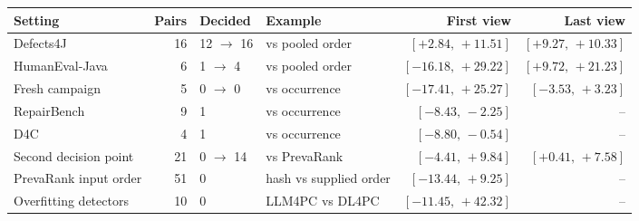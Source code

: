 \begin{tabular}{@{}lrllrr@{}}
\toprule
Setting & Pairs & Decided & Example & First view & Last view \\
\midrule
Defects4J & 16 & 12 $\rightarrow$ 16 & vs pooled order & $[+2.84,\,+11.51]$ & $[+9.27,\,+10.33]$ \\
HumanEval-Java & 6 & 1 $\rightarrow$ 4 & vs pooled order & $[-16.18,\,+29.22]$ & $[+9.72,\,+21.23]$ \\
Fresh campaign & 5 & 0 $\rightarrow$ 0 & vs occurrence & $[-17.41,\,+25.27]$ & $[-3.53,\,+3.23]$ \\
RepairBench & 9 & 1 & vs occurrence & $[-8.43,\,-2.25]$ & -- \\
D4C & 4 & 1 & vs occurrence & $[-8.80,\,-0.54]$ & -- \\
Second decision point & 21 & 0 $\rightarrow$ 14 & vs PrevaRank & $[-4.41,\,+9.84]$ & $[+0.41,\,+7.58]$ \\
PrevaRank input order & 51 & 0 & hash vs supplied order & $[-13.44,\,+9.25]$ & -- \\
Overfitting detectors & 10 & 0 & LLM4PC vs DL4PC & $[-11.45,\,+42.32]$ & -- \\
\bottomrule
\end{tabular}
